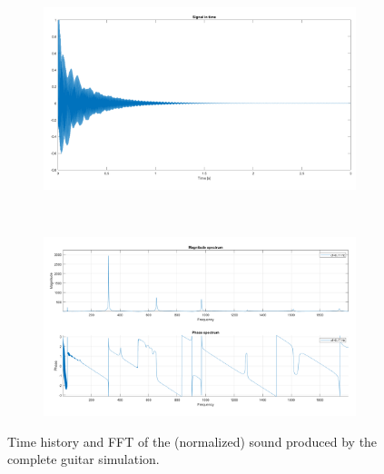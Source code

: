 \documentclass[a4paper]{article}
\begin{document}
\begin{figure}[h]
	\centering
	\begin{subfigure}{0.48\linewidth}
		\centering
		\includegraphics[width=0.95\linewidth]{pluck.png}
	\end{subfigure}
	~
	\begin{subfigure}{0.48\linewidth}
		\centering
		\includegraphics[width=0.95\linewidth]{guitSpectrum.png}
	\end{subfigure}
	\caption{Time history and FFT of the (normalized) sound produced by the complete guitar simulation.}
	\label{fig:complete}
\end{figure}


\printbibliography
\end{document}

